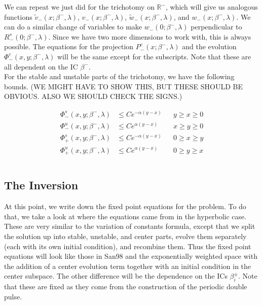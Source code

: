 \documentclass[12pt]{article}
\def\R{{\mathbb R}}
\begin{document}
We can repeat we just did for the trichotomy on $\R^-$, which will give us analogous functions $\tilde{v}_-(x; \beta^-, \lambda)$, $v_-(x; \beta^-, \lambda)$, $\tilde{w}_-(x; \beta^-, \lambda)$, and $w_-(x; \beta^-, \lambda)$. We can do a similar change of variables to make $w_-(0; \beta^-, \lambda)$ perpendicular to $R^s_-(0; \beta^-, \lambda)$. Since we have two more dimensions to work with, this is always possible. The equations for the projection $P^c_-(x; \beta^-, \lambda)$ and the evolution $\Phi^c_-(x,y; \beta^-, \lambda)$ will be the same except for the subscripts. Note that these are all dependent on the IC $\beta^-$.
\\

For the stable and unstable parts of the trichotomy, we have the following bounds. (WE MIGHT HAVE TO SHOW THIS, BUT THESE SHOULD BE OBVIOUS. ALSO WE SHOULD CHECK THE SIGNS.)

\begin{align*}
\Phi^s_-(x, y; \beta^-, \lambda) &\leq C e^{-\alpha(y - x)} && y \geq x \geq 0\\
\Phi^u_-(x, y; \beta^-, \lambda) &\leq C e^{\alpha(y - x)} && x \geq y \geq 0\\
\Phi^s_+(x, y; \beta^-, \lambda) &\leq C e^{-\alpha(y - x)} && 0 \geq x \geq y\\
\Phi^u_+(x, y; \beta^-, \lambda) &\leq C e^{\alpha(y - x)} && 0 \geq y \geq x \\\\
\end{align*}


\subsection{The Inversion}

At this point, we write down the fixed point equations for the problem. To do that, we take a look at where the equations came from in the hyperbolic case. These are very similar to the variation of constants formula, except that we split the solution up into stable, unstable, and center parts, evolve them separately (each with its own initial condition), and recombine them. Thus the fixed point equations will look like those in San98 and the exponentially weighted space with the addition of a center evolution term together with an initial condition in the center subspace. The other difference will be the dependence on the ICs $\beta_i^\pm$. Note that these are fixed as they come from the construction of the periodic double pulse.
\\ 
\end{document}
